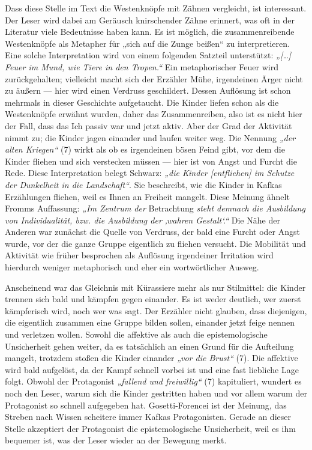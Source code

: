 \documentclass[12pt,a4paper]{article}
\begin{document}
Dass diese Stelle im Text die Westenknöpfe mit Zähnen vergleicht, ist interessant. Der Leser wird dabei am Geräusch knirschender Zähne erinnert, was oft in der Literatur viele Bedeutnisse haben kann. Es ist möglich, die zusammenreibende Westenknöpfe als Metapher für „sich auf die Zunge beißen“ zu interpretieren. Eine solche Interpretation wird von einem folgenden Satzteil unterstützt: \textit{„[…] Feuer im Mund, wie Tiere in den Tropen.“} Ein metaphorischer Feuer wird zurückgehalten; vielleicht macht sich der Erzähler Mühe, irgendeinen Ärger nicht zu äußern — hier wird einen Verdruss geschildert. Dessen Auflösung ist schon mehrmals in dieser Geschichte aufgetaucht. Die Kinder liefen schon als die Westenknöpfe erwähnt wurden, daher das Zusammenreiben, also ist es nicht hier der Fall, dass das Ich passiv war und jetzt aktiv. Aber der Grad der Aktivität nimmt zu; die Kinder jagen einander und laufen weiter weg. Die Nennung \textit{„der alten Kriegen“} (7) wirkt als ob es irgendeinen bösen Feind gibt, vor dem die Kinder fliehen und sich verstecken müssen — hier ist von Angst und Furcht die Rede. Diese Interpretation belegt Schwarz: \textit{„die Kinder [entfliehen] im Schutze der Dunkelheit in die Landschaft“}.\autocite[528]{schwarz} Sie beschreibt, wie die Kinder in Kafkas Erzählungen fliehen, weil es Ihnen an Freiheit mangelt. Diese Meinung ähnelt Fromms Auffassung: \textit{„Im Zentrum der} Betrachtung \textit{steht demnach die Ausbildung von Individualität, bzw. die Ausbildung der ‚wahren Gestalt‘.“}\autocite[102]{fromm} Die Nähe der Anderen war zunächst die Quelle von Verdruss, der bald eine Furcht oder Angst wurde, vor der die ganze Gruppe eigentlich zu fliehen versucht. Die Mobilität und Aktivität wie früher besprochen als Auflösung irgendeiner Irritation wird hierdurch weniger metaphorisch und eher ein wortwörtlicher Ausweg.\par
%
Anscheinend war das Gleichnis mit Kürassiere mehr als nur Stilmittel: die Kinder trennen sich bald und kämpfen gegen einander. Es ist weder deutlich, wer zuerst kämpferisch wird, noch wer was sagt. Der Erzähler nicht glauben, dass diejenigen, die eigentlich zusammen eine Gruppe bilden sollen, einander jetzt feige nennen und verletzen wollen. Sowohl die affektive als auch die epistemologische Unsicherheit gehen weiter, da es tatsächlich an einen Grund für die Aufteilung mangelt, trotzdem stoßen die Kinder einander \textit{„vor die Brust“} (7). Die affektive wird bald aufgelöst, da der Kampf schnell vorbei ist und eine fast liebliche Lage folgt. Obwohl der Protagonist \textit{„fallend und freiwillig“} (7) kapituliert, wundert es noch den Leser, warum sich die Kinder gestritten haben und vor allem warum der Protagonist so schnell aufgegeben hat. Gosetti-Forencei ist der Meinung, das Streben nach Wissen scheitere immer Kafkas Protagonisten.\autocite[1]{gosetti2021} Gerade an dieser Stelle akzeptiert der Protagonist die epistemologische Unsicherheit, weil es ihm bequemer ist, was der Leser wieder an der Bewegung merkt.\par
\end{document}
